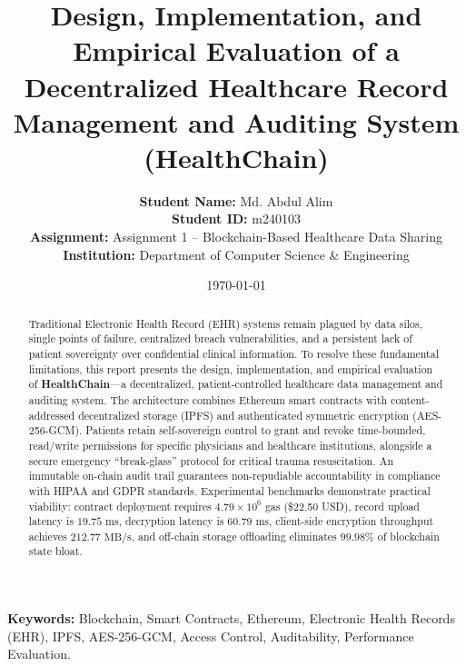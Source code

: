 \documentclass[11pt,a4paper]{article}
\begin{document}
\title{\textbf{\Large Design, Implementation, and Empirical Evaluation of a Decentralized Healthcare Record Management and Auditing System (HealthChain)}}

\author{
    \textbf{Student Name:} Md. Abdul Alim \\
    \textbf{Student ID:} m240103 \\
    \textbf{Assignment:} Assignment 1 -- Blockchain-Based Healthcare Data Sharing \\
    \textbf{Institution:} Department of Computer Science \& Engineering
}
\date{\today}

\maketitle

\begin{abstract}
Traditional Electronic Health Record (EHR) systems remain plagued by data silos, single points of failure, centralized breach vulnerabilities, and a persistent lack of patient sovereignty over confidential clinical information. To resolve these fundamental limitations, this report presents the design, implementation, and empirical evaluation of \textbf{HealthChain}---a decentralized, patient-controlled healthcare data management and auditing system. The architecture combines Ethereum smart contracts with content-addressed decentralized storage (IPFS) and authenticated symmetric encryption (AES-256-GCM). Patients retain self-sovereign control to grant and revoke time-bounded, read/write permissions for specific physicians and healthcare institutions, alongside a secure emergency ``break-glass'' protocol for critical trauma resuscitation. An immutable on-chain audit trail guarantees non-repudiable accountability in compliance with HIPAA and GDPR standards. Experimental benchmarks demonstrate practical viability: contract deployment requires $4.79 \times 10^6$ gas (\$22.50 USD), record upload latency is $19.75\text{ ms}$, decryption latency is $60.79\text{ ms}$, client-side encryption throughput achieves $212.77\text{ MB/s}$, and off-chain storage offloading eliminates $99.98\%$ of blockchain state bloat.
\end{abstract}

\vspace{0.5cm}
\noindent\textbf{Keywords:} Blockchain, Smart Contracts, Ethereum, Electronic Health Records (EHR), IPFS, AES-256-GCM, Access Control, Auditability, Performance Evaluation.
\end{document}

